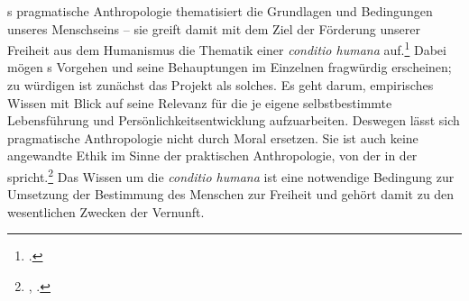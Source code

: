 s pragmatische Anthropologie thematisiert die Grundlagen
und Bedingungen unseres Menschseins -- sie greift damit mit dem Ziel der
Förderung unserer Freiheit aus dem Humanismus die Thematik einer \emph{conditio
humana}
auf.\footcite[Vgl.][476]{Zoeller:DieBestimmungderBestimmungdesMenschenbeiMendelssohnundKant2001}
Dabei mögen s Vorgehen und seine Behauptungen im Einzelnen
fragwürdig erscheinen; zu würdigen ist zunächst das Projekt als solches. Es geht
darum, empirisches Wissen mit Blick auf seine Relevanz für die je eigene
selbstbestimmte Lebensführung und Persönlichkeitsentwicklung aufzuarbeiten.
Deswegen lässt sich pragmatische Anthropologie nicht durch Moral ersetzen. Sie
ist auch keine angewandte Ethik im Sinne der praktischen Anthropologie, von der
 in der 
spricht.\footnote{\cite[Vgl.][BA v]{Kant:GrundlegungzurMetaphysikderSitten1965},
\cite[][IV: 388.9--14]{Kant:GesammelteWerke1900ff.}.} Das Wissen um die
\emph{conditio humana} ist eine notwendige Bedingung zur Umsetzung der
Bestimmung des Menschen zur Freiheit und gehört damit zu den wesentlichen
Zwecken der Vernunft.

